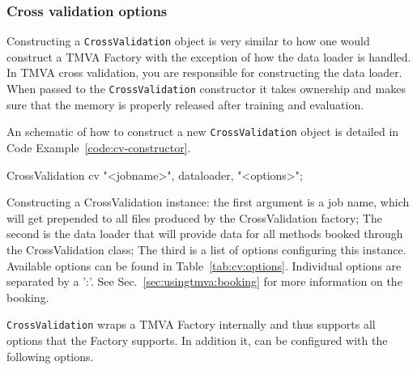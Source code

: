 \subsubsection{Cross validation options}

Constructing a \texttt{CrossValidation} object is very similar to how one would construct a TMVA Factory with the exception of how the data loader is handled. In TMVA cross validation, you are responsible for constructing the data loader. When passed to the \texttt{CrossValidation} constructor it takes ownership and makes sure that the memory is properly released after training and evaluation.

An schematic of how to construct a new \texttt{CrossValidation} object is detailed in Code Example~\ref{code:cv-constructor}.

\begin{codeexample}
\begin{tmvacode}
CrossValidation cv {"<jobname>", dataloader, "<options>"};
\end{tmvacode}
\caption[.]{\codeexampleCaptionSize Constructing a CrossValidation instance:
   the first argument is a job name, which will get prepended to all files
   produced by the CrossValidation factory; The second is the data loader that
   will provide data for all methods booked through the CrossValidation class;
   The third is a list of options configuring this instance. Available options
   can be found in Table~\ref{tab:cv:options}.
   Individual options are separated by a ':'. See
   Sec.~\ref{sec:usingtmva:booking} for more information on the booking.}
\label{code:cv-constructor}
\end{codeexample}

\texttt{CrossValidation} wraps a TMVA Factory internally and thus supports all options that the Factory supports. In addition it, can be configured with the following options.

